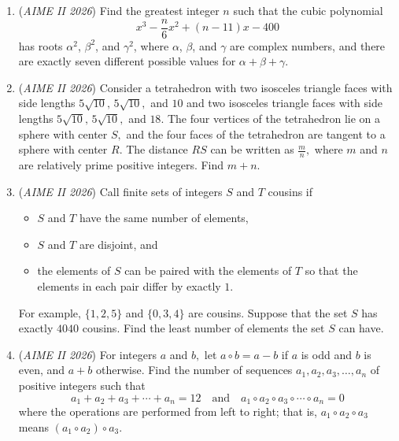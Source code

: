 \begin{enumerate}
	\item (\textit{AIME II 2026}) Find the greatest integer $n$ such that the cubic polynomial
 \[x^{3} -\frac{n}{6}x^{2} + (n - 11)x - 400\]has roots $\alpha^{2}$, $\beta^{2}$, and $\gamma^{2}$, where $\alpha$, $\beta$, and $\gamma$ are complex numbers, and there are exactly seven different possible values for $\alpha + \beta + \gamma$.


 

	\item (\textit{AIME II 2026}) Consider a tetrahedron with two isosceles triangle faces with side lengths $5\sqrt{10}, \,5\sqrt{10},$ and $10$ and two isosceles triangle faces with side lengths $5\sqrt{10},\, 5\sqrt{10},$ and $18.$ The four vertices of the tetrahedron lie on a sphere with center $S,$ and the four faces of the tetrahedron are tangent to a sphere with center $R.$ The distance $RS$ can be written as $\frac mn,$ where $m$ and $n$ are relatively prime positive integers. Find ${}m + n.$


	\item (\textit{AIME II 2026}) Call finite sets of integers $S$ and $T$ cousins if


 
            \begin{itemize}
        \item $S$ and $T$ have the same number of elements,

        \item $S$ and $T$ are disjoint, and

        \item the elements of $S$ can be paired with the elements of $T$ so that the elements in each pair differ by exactly $1$.
            \end{itemize}
            For example, $\{1,2,5\}$ and $\{0,3,4\}$ are cousins. Suppose that the set $S$ has exactly $4040$ cousins. Find the least number of elements the set $S$ can have.


 

	\item (\textit{AIME II 2026}) For integers $a$ and $b,$ let $a \circ b = a - b$ if $a$ is odd and $b$ is even, and $a+b$ otherwise. Find the number of sequences $a_1, a_2, a_3, \ldots, a_n$ of positive integers such that
 \[a_1 + a_2 + a_3 + \cdots + a_n = 12 \quad \text{and} \quad a_1 \circ a_2 \circ a_3 \circ \cdots \circ a_n = 0\]where the operations are performed from left to right; that is, $a_1 \circ a_2 \circ a_3$ means $(a_1 \circ a_2) \circ a_3.$



\end{enumerate}
